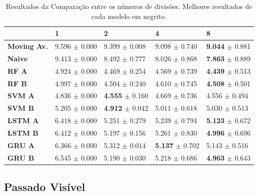 \begin{table}[htbp]
    \begin{tabular*}{\linewidth}{@{\extracolsep{\fill}}lllll}
    \toprule
     & 
    \multicolumn{1}{l}{\textbf{1}} & 
    \multicolumn{1}{l}{\textbf{2}} &
    \multicolumn{1}{l}{\textbf{4}} &
    \multicolumn{1}{l}{\textbf{8}} \\
    \midrule
    \textbf{Moving Av.} & 9.596 $\pm$ 0.000 & 9.399 $\pm$ 0.008 & 9.098 $\pm$ 0.740 & \textbf{9.044} $\pm$ 0.881
    \\
    \midrule
    \textbf{Naive} & 9.413 $\pm$ 0.000 & 8.492 $\pm$ 0.777 & 8.026 $\pm$ 0.868 & \textbf{7.863} $\pm$ 0.889
    \\
    \midrule
    \textbf{RF A} & 4.924 $\pm$ 0.000 & 4.469 $\pm$ 0.254 & 4.569 $\pm$ 0.739 & \textbf{4.439} $\pm$ 0.513
    \\
    \midrule
    \textbf{RF B} & 4.997 $\pm$ 0.000 & 4.504 $\pm$ 0.240 & 4.610 $\pm$ 0.745 & \textbf{4.508} $\pm$ 0.501
    \\
    \midrule
    \textbf{SVM A} & 4.836 $\pm$ 0.000 & \textbf{4.555} $\pm$ 0.160 & 4.669 $\pm$ 0.736 & 4.556 $\pm$ 0.494
    \\
    \midrule
    \textbf{SVM B} & 5.205 $\pm$ 0.000 & \textbf{4.912} $\pm$ 0.042 & 5.011 $\pm$ 0.618 & 5.030 $\pm$ 0.513
    \\
    \midrule
    \textbf{LSTM A} & 6.418 $\pm$ 0.000 & 5.251 $\pm$ 0.279 & 5.239 $\pm$ 0.794 & \textbf{5.123} $\pm$ 0.672
    \\
    \midrule
    \textbf{LSTM B} & 6.412 $\pm$ 0.000 & 5.197 $\pm$ 0.156 & 5.261 $\pm$ 0.830 & \textbf{4.996} $\pm$ 0.696
    \\
    \midrule
    \textbf{GRU A} & 6.366 $\pm$ 0.000 & 5.312 $\pm$ 0.014 & \textbf{5.137} $\pm$ 0.702 & 5.143 $\pm$ 0.516
    \\
    \midrule
    \textbf{GRU B} & 6.545 $\pm$ 0.000 & 5.190 $\pm$ 0.030 & 5.218 $\pm$ 0.686 & \textbf{4.963} $\pm$ 0.643
    \\
    \bottomrule
    \end{tabular*}
    \label{table:res_split}
    \caption{Resultados da Comparação entre os números de divisões. Melhores resultados de cada modelo em negrito.}
\end{table}

\subsection{Passado Visível}

